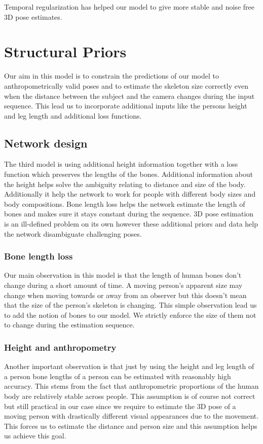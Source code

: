 Temporal regularization has helped our model to give more stable and noise free 3D pose estimates.


\section{Structural Priors}

Our aim in this model is to constrain the predictions of our model to anthropometrically valid poses and to estimate the skeleton size correctly even when the distance between the subject and the camera changes during the input sequence. This lead us to incorporate additional inputs like the persons height and leg length and additional loss functions.

\subsection{Network design}

The third model is using additional height information together with a loss function which preserves the lengths of the bones. Additional information about the height helps solve the ambiguity relating to distance and size of the body. Additionally it help the network to work for people with different body sizes and body compositions. Bone length loss helps the network estimate the length of bones and makes sure it stays constant during the sequence. 3D pose estimation is an ill-defined problem on its own however these additional priors and data help the network disambiguate challenging poses.

\subsubsection{Bone length loss}

Our main observation in this model is that the length of human bones don't change during a short amount of time. A moving person's apparent size may change when moving towards or away from an observer but this doesn't mean that the size of the person's skeleton is changing. This simple observation lead us to add the notion of bones to our model. We strictly enforce the size of them not to change during the estimation sequence.

\subsubsection{Height and anthropometry}

Another important observation is that just by using the height and leg length of a person bone lengths of a person can be estimated with reasonably high accuracy. This stems from the fact that anthropometric proportions of the human body are relatively stable across people. This assumption is of course not correct but still practical in our case since we require to estimate the 3D pose of a moving person with drastically different visual appearances due to the movement. This forces us to estimate the distance and person size and this assumption helps us achieve this goal.

